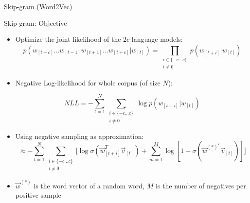 \begin{vbframe}{Skip-gram (Word2Vec)}
\vfill

\end{vbframe}


\begin{vbframe}{Skip-gram: Objective}

\vfill

\footnotesize
\begin{itemize}
	\item Optimize the joint likelihood of the $2c$ language models:
	$$p (w_{[t-c]} \dots w_{[t-1]} w_{[t+1]} \dots w_{[t+c]}|w_{[t]}) = \prod_{\substack{i \in  \{-c \ldots c\}\\ i \neq 0}} p(w_{[t+i]}|w_{[t]})$$
	
	\item Negative Log-likelihood for whole corpus (of size $N$):
	
	$$NLL = - \sum_{t=1}^N \sum_{\substack{i \in  \{-c \ldots c\}\\ i \neq 0}} \log p (w_{[t+i]}|w_{[t]})$$

	\item Using negative sampling as approximation:
		$$\approx - \sum_{t=1}^N \sum_{\substack{i \in  \{-c \ldots c\}\\ i \neq 0}} \Big[ \log \sigma(\vec w_{[t+i]}^T \vec v_{[t]}) + \sum_{m=1}^{M} \log [1-\sigma(\vec w^{{(*)}^T} \vec v_{[t]})]\Big] $$
	\item $\vec w^{(*)}$ is the word vector of a random word, $M$ is the number of negatives per positive sample
\end{itemize}

\vfill

\end{vbframe}


